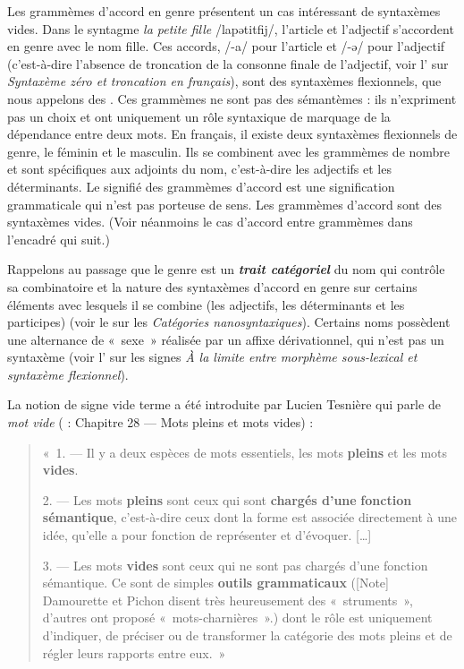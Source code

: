 Les grammèmes d’accord en genre présentent un cas intéressant de syntaxèmes vides. Dans le syntagme \textit{la petite fille} /lapətitfij/, l’article et l’adjectif s’accordent en genre avec le nom fille. Ces accords, /-a/ pour l’article et /-ə/ pour l’adjectif (c’est-à-dire l’absence de troncation de la consonne finale de l’adjectif, voir l’ sur \textit{Syntaxème zéro et troncation en français}), sont des syntaxèmes flexionnels, que nous appelons des . Ces grammèmes ne sont pas des sémantèmes : ils n’expriment pas un choix et ont uniquement un rôle syntaxique de marquage de la dépendance entre deux mots. En français, il existe deux syntaxèmes flexionnels de genre, le féminin et le masculin. Ils se combinent avec les grammèmes de nombre et sont spécifiques aux adjoints du nom, c’est-à-dire les adjectifs et les déterminants. Le signifié des grammèmes d’accord est une signification grammaticale qui n’est pas porteuse de sens. Les grammèmes d’accord sont des syntaxèmes vides. (Voir néanmoins le cas d’accord entre grammèmes dans l’encadré qui suit.)

Rappelons au passage que le genre est un \textbf{\textit{trait catégoriel}} du nom qui contrôle sa combinatoire et la nature des syntaxèmes d’accord en genre sur certains éléments avec lesquels il se combine (les adjectifs, les déterminants et les participes) (voir le  sur les \textit{Catégories nanosyntaxiques}). Certains noms possèdent une alternance de «~sexe~» réalisée par un affixe dérivationnel, qui n’est pas un syntaxème (voir l’ sur les signes \textit{À la limite entre morphème sous-lexical et syntaxème flexionnel}).

La notion de signe vide terme a été introduite par Lucien Tesnière qui parle de \textit{mot vide} (\citeyear{Tesnières1959} : Chapitre 28 — Mots pleins et mots vides) :
\begin{quote}
    «~1. — Il y a deux espèces de mots essentiels, les mots \textbf{pleins} et les mots \textbf{vides}.

    2. — Les mots \textbf{pleins} sont ceux qui sont \textbf{chargés d’une} \textbf{fonction sémantique}, c’est-à-dire ceux dont la forme est associée directement à une idée, qu’elle a pour fonction de représenter et d’évoquer. […]

    3. — Les mots \textbf{vides} sont ceux qui ne sont pas chargés d’une fonction sémantique. Ce sont de simples \textbf{outils grammaticaux} ([Note] Damourette et Pichon disent très heureusement des «~struments~», d’autres ont proposé «~mots-charnières~».) dont le rôle est uniquement d’indiquer, de préciser ou de transformer la catégorie des mots pleins et de régler leurs rapports entre eux.~»
\end{quote}

